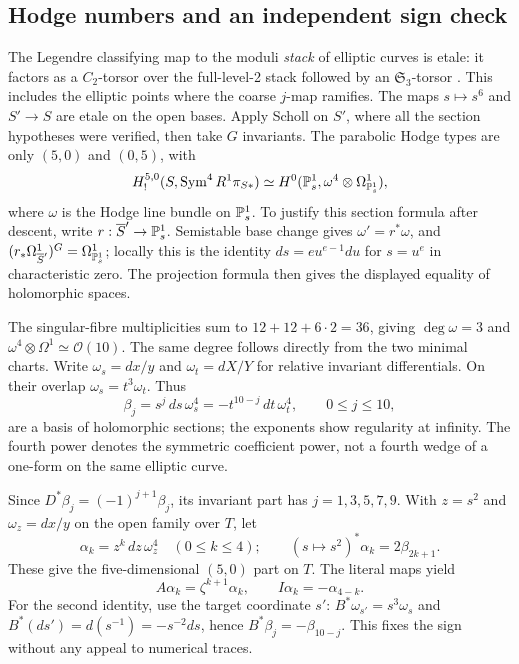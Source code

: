 \subsection{Hodge numbers and an independent sign check}
The Legendre classifying map to the moduli \emph{stack} of elliptic curves is
etale: it factors as a $C_2$-torsor over the full-level-2 stack followed by an
$\mathfrak S_3$-torsor \cite[Lemma~4.3 and Proposition~4.5]{AntieauMeier}. This includes the
elliptic points where the coarse $j$-map ramifies. The maps $s\mapsto s^6$
and $S'\to S$ are etale on the open bases. Apply Scholl \cite[Section~2.13]{SchollVanishing} on $S'$,
where all the section hypotheses were verified, then take $G$ invariants.
The parabolic Hodge types are only $(5,0)$ and $(0,5)$, with
\[
H^{5,0}_!(S,\operatorname{Sym}^4 R^1\pi_{S*})
\simeq H^0(\mathbb P^1_s,\omega^4\otimes\Omega^1_{\mathbb P^1_s}),
\]
where $\omega$ is the Hodge line bundle on $\mathbb P^1_s$. To justify this section
formula after descent, write $r:\overline S'\to\mathbb P^1_s$. Semistable base
change gives $\omega'=r^*\omega$, and
$(r_*\Omega^1_{\overline S'})^G=\Omega^1_{\mathbb P^1_s}$; locally this is the
identity $ds=e u^{e-1}du$ for $s=u^e$ in characteristic zero. The projection
formula then gives the displayed equality of holomorphic spaces.

The singular-fibre multiplicities sum to $12+12+6\cdot2=36$, giving
$\deg\omega=3$ and $\omega^4\otimes\Omega^1\simeq\mathcal O(10)$.
The same degree follows directly from the two minimal charts. Write
$\omega_s=dx/y$ and $\omega_t=dX/Y$ for relative invariant differentials.
On their overlap $\omega_s=t^3\omega_t$. Thus
\[
\beta_j=s^j\,ds\,\omega_s^4
       =-t^{10-j}\,dt\,\omega_t^4,\qquad 0\le j\le10,
\]
are a basis of holomorphic sections; the exponents show regularity at infinity.
The fourth power denotes the symmetric coefficient power, not a fourth wedge
of a one-form on the same elliptic curve.

Since $D^*\beta_j=(-1)^{j+1}\beta_j$, its invariant part has $j=1,3,5,7,9$.
With $z=s^2$ and $\omega_z=dx/y$ on the open family over $T$, let
\[
\alpha_k=z^k\,dz\,\omega_z^4\quad(0\le k\le4);
\qquad (s\mapsto s^2)^*\alpha_k=2\beta_{2k+1}.
\]
These give the five-dimensional $(5,0)$ part on $T$. The literal maps yield
\[
A\alpha_k=\zeta^{k+1}\alpha_k,\qquad I\alpha_k=-\alpha_{4-k}.
\]
For the second identity, use the target coordinate $s'$: $B^*\omega_{s'}=s^3\omega_s$
and $B^*(ds')=d(s^{-1})=-s^{-2}ds$, hence $B^*\beta_j=-\beta_{10-j}$.
This fixes the sign without any appeal to numerical traces.

